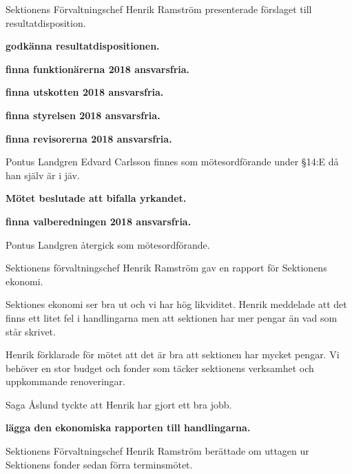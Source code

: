 \documentclass[10pt]{article}
\begin{document}
\begin{paragrafer}
Sektionens Förvaltningschef Henrik Ramström presenterade förslaget till resultatdisposition.

\textbf{\Mba godkänna resultatdispositionen.}


  \begin{paragrafer}

    \textbf{\Mba finna funktionärerna 2018 ansvarsfria.}


    \textbf{\Mba finna utskotten 2018 ansvarsfria.}
    
    
    \textbf{\Mba finna styrelsen 2018 ansvarsfria.}
    

    \textbf{\Mba finna revisorerna 2018 ansvarsfria.}

   

    Pontus Landgren \ypa Edvard Carlsson finnes som mötesordförande under \S14:E då han själv är i jäv.

    \textbf{Mötet beslutade att bifalla yrkandet.}

    \textbf{\Mba finna valberedningen 2018 ansvarsfria.}

    Pontus Landgren återgick som mötesordförande. 


  \end{paragrafer}

Sektionens förvaltningschef Henrik Ramström gav en rapport för Sektionens ekonomi.

Sektiones ekonomi ser bra ut och vi har hög likviditet. Henrik meddelade att det finns ett litet fel i handlingarna men att sektionen har mer pengar än vad som står skrivet. 

Henrik förklarade för mötet att det är bra att sektionen har mycket pengar. Vi behöver en stor budget och fonder som täcker sektionens verksamhet och uppkommande renoveringar. 

Saga Åslund tyckte att Henrik har gjort ett bra jobb. 

\textbf{\Mba lägga den ekonomiska rapporten till handlingarna.}

Sektionens Förvaltningschef Henrik Ramström berättade om uttagen ur Sektionens fonder sedan förra terminsmötet.


\end{paragrafer}
\end{document}
